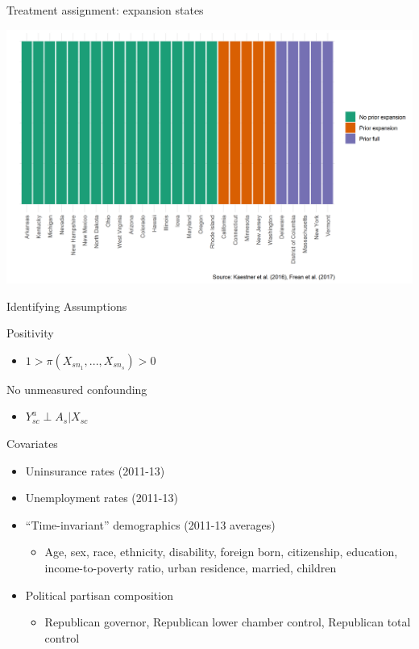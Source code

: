 \documentclass[hyperref={pdfpagelabels=false}]{beamer}
\begin{document}
\begin{frame}{Treatment assignment: expansion states}
    \begin{center}
	\includegraphics[scale=0.5]{01_Plots/expansion-heterogeneity-txonly.png}
    \end{center}
\end{frame}

\begin{frame}{Identifying Assumptions}
    \item Positivity \bigskip
    \begin{itemize}
        \item $1 > \pi(X_{sn_1}, ..., X_{sn_s}) > 0$ \bigskip
    \end{itemize}
    \item No unmeasured confounding \bigskip
    \begin{itemize}
        \item $Y^a_{sc} \perp A_s | X_{sc}$ \bigskip 
    \end{itemize}
\end{frame}

\begin{frame}{Covariates}
\begin{itemize}
    \item Uninsurance rates (2011-13) \bigskip
    \item Unemployment rates (2011-13) \bigskip
    \item ``Time-invariant'' demographics (2011-13 averages) \bigskip
    \begin{itemize}
        \item Age, sex, race, ethnicity, disability, foreign born, citizenship, education, income-to-poverty ratio, urban residence, married, children \bigskip
    \end{itemize}
    \item Political partisan composition \bigskip
    \begin{itemize}
        \item Republican governor, Republican lower chamber control, Republican total control
    \end{itemize}
\end{itemize}
\end{frame}
\end{document}
